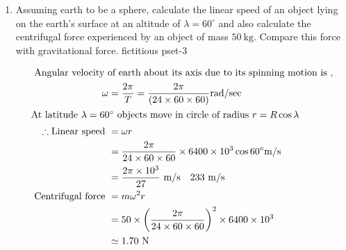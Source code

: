 \begin{enumerate} [label=\color{ocre}\textbf{\arabic*.}]
\begin{figure}[H]
	\centering
	\texttt{[image: pset-3- fict]}
\end{figure}
\begin{answer}
\begin{align*}
\text { Horizontal acceleration of the system is } a_{0}&=\frac{F}{M+m}
\intertext{According to question, the block does not slide on the wedge, therefore if block is seen from the reference frame of the wedge it will appear stationary. The wedge has a linear acceleration $a_{0}$ therefore if observation is made from the wedge frame a pseudo force $-m a_{0}$ must be applied on the block as shown in figure. Block is stationary on the wedge so component of forces parallel to the inclined plane must cancel.}
\text{Therefore,} \ m g \sin \theta&=m a_{0} \cos \theta\\  \text{or}\ \tan \theta&=\frac{a_{0}}{g}\\&=\frac{F}{(M+m) g}\\ \text{or}\ F&=(M+m) g \tan \theta
\end{align*}
\end{answer}
\item Assuming earth to be a sphere, calculate the linear speed of an object lying on the earth's surface at an altitude of $\lambda=60^{\circ}$ and also calculate the centrifugal force experienced by an object of mass $50 \mathrm{~kg}$. Compare this force with gravitational force.
fictitious pset-3
\begin{answer}
	\begin{align*}
	\intertext { Angular velocity of earth about its axis due to its spinning motion is ,}
	\omega&=\frac{2 \pi}{T}=\frac{2 \pi}{(24 \times 60 \times 60)} \mathrm{rad} / \mathrm{sec}\\
	\intertext{At latitude $\lambda=60^{\circ}$ objects move in circle of radius $r=R \cos \lambda$}
	\therefore \text {Linear speed }&=\omega r\\
	&=\frac{2 \pi}{24 \times 60 \times 60} \times 6400 \times 10^{3} \cos 60^{\circ} \mathrm{m} / \mathrm{s} \\
	&=\frac{2 \pi \times 10^{3}}{27} \mathrm{~m} / \mathrm{s} \quad 233 \mathrm{~m} / \mathrm{s}\\
	\text { Centrifugal force }&=m \omega^{2} r \\
	&=50 \times\left(\frac{2 \pi}{24 \times 60 \times 60}\right)^{2} \times 6400 \times 10^{3} \\
	&\simeq 1.70 \mathrm{~N} \\

\end{align*}
\end{answer}
\end{enumerate}
